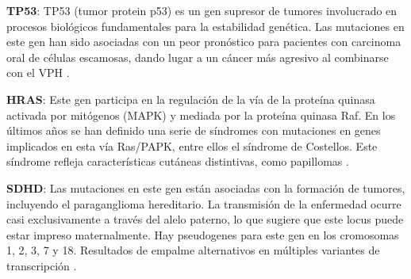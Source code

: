 \textbf{TP53}: TP53 (tumor protein p53) es un gen supresor de tumores involucrado en procesos biológicos fundamentales para la estabilidad genética. Las mutaciones en este gen han sido asociadas con un peor pronóstico para pacientes con carcinoma oral de células escamosas, dando lugar a un cáncer más agresivo al combinarse con el VPH \cite{McKenna2021}.

\textbf{HRAS}: Este gen participa en la regulación de la vía de la proteína quinasa activada por mitógenos (MAPK) y mediada por la proteína quinasa Raf. En los últimos años se han definido una serie de síndromes con mutaciones en genes implicados en esta vía Ras/PAPK, entre ellos el síndrome de Costellos. Este síndrome refleja características cutáneas distintivas, como papillomas \cite{Siegel2012}.

\textbf{SDHD}: Las mutaciones en este gen están asociadas con la formación de tumores, incluyendo el paraganglioma hereditario. La transmisión de la enfermedad ocurre casi exclusivamente a través del alelo paterno, lo que sugiere que este locus puede estar impreso maternalmente. Hay pseudogenes para este gen en los cromosomas 1, 2, 3, 7 y 18. Resultados de empalme alternativos en múltiples variantes de transcripción \cite{Hensen2004}.
